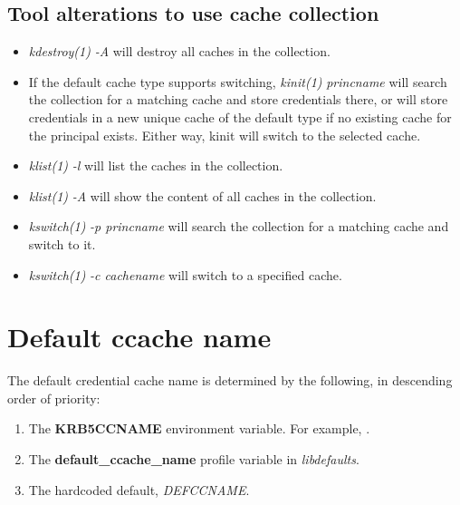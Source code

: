\documentclass[letterpaper,10pt,english]{sphinxmanual}
\begin{document}
\subsection{Tool alterations to use cache collection}
\label{basic/ccache_def:tool-alterations-to-use-cache-collection}\begin{itemize}
\item {} 
\emph{kdestroy(1)} \emph{-A} will destroy all caches in the collection.

\item {} 
If the default cache type supports switching, \emph{kinit(1)}
\emph{princname} will search the collection for a matching cache and
store credentials there, or will store credentials in a new unique
cache of the default type if no existing cache for the principal
exists.  Either way, kinit will switch to the selected cache.

\item {} 
\emph{klist(1)} \emph{-l} will list the caches in the collection.

\item {} 
\emph{klist(1)} \emph{-A} will show the content of all caches in the
collection.

\item {} 
\emph{kswitch(1)} \emph{-p princname} will search the collection for a
matching cache and switch to it.

\item {} 
\emph{kswitch(1)} \emph{-c cachename} will switch to a specified cache.

\end{itemize}


\section{Default ccache name}
\label{basic/ccache_def:default-ccache-name}
The default credential cache name is determined by the following, in
descending order of priority:
\begin{enumerate}
\item {} 
The \textbf{KRB5CCNAME} environment variable.  For example,
.

\item {} 
The \textbf{default\_ccache\_name} profile variable in \emph{libdefaults}.

\item {} 
The hardcoded default, \emph{DEFCCNAME}.

\end{enumerate}
\end{document}
